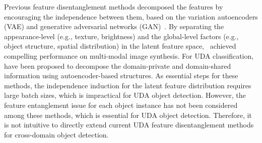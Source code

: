 \documentclass[journal]{IEEEtran}
\begin{document}
Previous feature disentanglement methods decomposed the features by encouraging the independence between them, based on the variation autoencoders (VAE) \cite{kingma2013auto,higgins2017beta} and generative adversarial networks (GAN)~\cite{mathieu2016disentangling,chen2016infogan}. By separating the appearance-level (e.g., texture, brightness) and the global-level factors (e.g., object structure, spatial distribution) in the latent feature space,~\cite{huang2018multimodal,lee2018diverse} achieved compelling performance on multi-modal image synthesis. For UDA classification,~\cite{bousmalis2016domain,cai2019learning,peng2019domain,peng2020domain2vec} have been proposed to decompose the domain-private and domain-shared information using autoencoder-based structures. As essential steps for these methods, the independence induction for the latent feature distribution requires large batch sizes, which is impractical for UDA object detection. {} However, the feature entanglement issue for each object instance has not been considered among these methods, which is essential for UDA object detection. Therefore, it is not intuitive to directly extend current UDA feature disentanglement methods for cross-domain object detection. 
\end{document}
